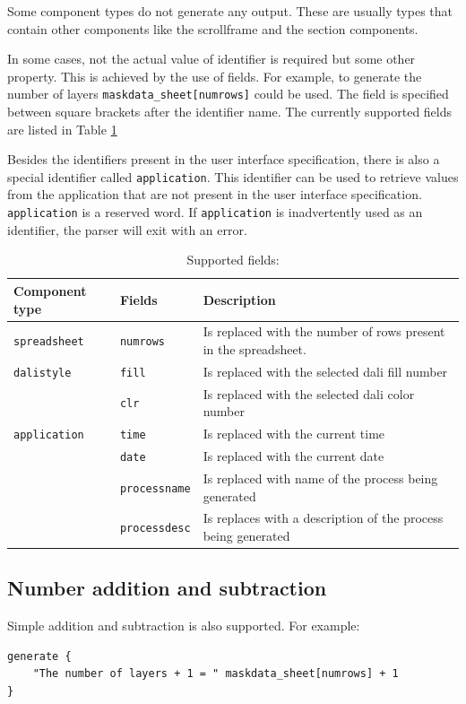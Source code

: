 Some component types do not generate any output. These are usually types that
contain other components like the scrollframe and the section components.

\bigskip \noindent
In some cases, not the actual value of identifier is required but some other
property. This is achieved by the use of fields. For example, to generate the
number of layers \verb=maskdata_sheet[numrows]= could be used. The field is
specified between square brackets after the identifier name. The currently
supported fields are listed in Table \ref{tab:language:fieldsupport}

Besides the identifiers present in the user interface specification, there is
also a special identifier called
\verb=application=. This identifier can be used to retrieve values from the
application that are not present in the user interface specification.
\verb=application= is a reserved word. If \verb=application= is inadvertently used as an identifier, the parser will exit
with an error.

\begin{table}[h] \begin{center}
\caption{Supported fields:}
\label{tab:language:fieldsupport}
\begin{tabularx}{\textwidth}{l|l|X}
\hline
 \textsf{Component type} & \textsf{Fields} & \textsf{Description} \\
\hline
\texttt{spreadsheet} & \texttt{numrows} & Is replaced with the number of rows present in the spreadsheet. \\
\texttt{dalistyle}   & \texttt{fill} & Is replaced with the selected dali fill number \\
                     & \texttt{clr}  & Is replaced with the selected dali color number \\
\texttt{application} & \texttt{time} & Is replaced with the current time \\
                     & \texttt{date} & Is replaced with the current date \\
                     & \texttt{processname} & Is replaced with name of the process being generated \\
                     & \texttt{processdesc} & Is replaces with a description of the process being generated \\
\hline
\end{tabularx}
\end{center}\end{table}

\subsection{Number addition and subtraction}
Simple addition and subtraction is also supported. For example:
\begin{verbatim}
generate {
    "The number of layers + 1 = " maskdata_sheet[numrows] + 1
}
\end{verbatim}

